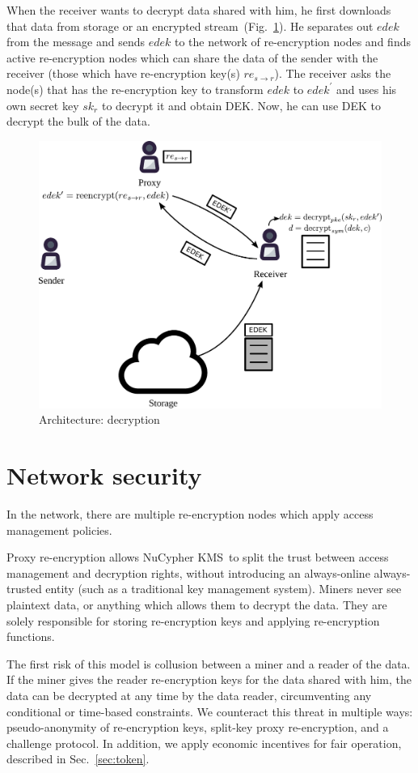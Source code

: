 \documentclass[longbibliography,nofootinbib]{revtex4-1}
\newcommand{\kms}{NuCypher KMS}
\newcommand{\figref}[1]{Fig.~\ref{#1}}
\begin{document}
When the receiver wants to decrypt data shared with him, he first downloads that data from storage or an encrypted stream~(\figref{fig:arch-decrypt}).
He separates out $edek$ from the message and sends $edek$ to the network of re-encryption nodes and finds active re-encryption nodes which can share the data
of the sender with the receiver (those which have re-encryption key(s) $re_{s\rightarrow r}$).
The receiver asks the node(s) that has the re-encryption key to transform $edek$ to $edek^{\prime}$ and uses his own secret key $sk_r$ to decrypt it and
obtain DEK.
Now, he can use DEK to decrypt the bulk of the data.
\begin{figure}
\centering
    \includegraphics[width=0.6\columnwidth]{pdf/decrypt.pdf}
    \caption{Architecture: decryption}
    \label{fig:arch-decrypt}
\end{figure}

\section{Network security}

In the network, there are multiple re-encryption nodes which apply access management policies.

Proxy re-encryption allows \kms~to split the trust between access management and decryption rights,
without introducing an always-online always-trusted entity (such as a traditional key management system).
Miners never see plaintext data, or anything which allows them to decrypt the data.
They are solely responsible for storing re-encryption keys and applying re-encryption functions.

The first risk of this model is collusion between a miner and a reader of the data.
If the miner gives the reader re-encryption keys for the data shared with him,
the data can be decrypted at any time by the data reader, circumventing any conditional or time-based constraints.
We counteract this threat in multiple ways: pseudo-anonymity of re-encryption keys, split-key proxy re-encryption, and a challenge protocol.
In addition, we apply economic incentives for fair operation, described in Sec.~\ref{sec:token}.
\end{document}
